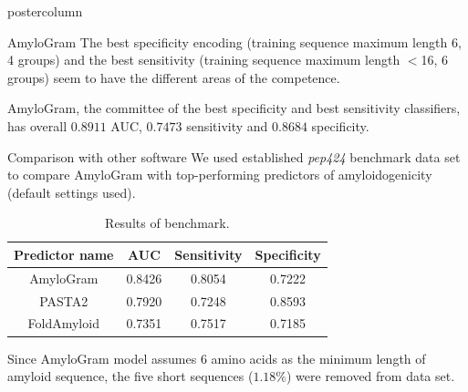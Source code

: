 \documentclass[final]{beamer}\usepackage[]{graphicx}\usepackage[]{color}
\begin{document}
\begin{frame}
\begin{columns}
\begin{column}{.525\textwidth}
\begin{beamercolorbox}[center,wd=\textwidth]{postercolumn}
\begin{minipage}[T]{.95\textwidth}
{%

\begin{block}{AmyloGram}
The best specificity encoding (training sequence maximum length 6, 4 groups) and the best sensitivity (training sequence maximum length $<$16, 6 groups) seem to have the different areas of the competence.

AmyloGram, the committee of the best specificity and best sensitivity classifiers, has overall $0.8911$ AUC, $0.7473$ sensitivity and $0.8684$ specificity.
\end{block}
\vfill

\begin{block}{Comparison with other software}
We used established \textit{pep424} benchmark data set~\citep{walsh_pasta_2014} to compare AmyloGram with top-performing  predictors of amyloidogenicity (default settings used).

\begin{table}[ht]
\centering
\caption{Results of benchmark.} 
\begin{tabular}{c|c|c|c}
  \toprule
Predictor name & AUC & Sensitivity & Specificity \\ 
  \midrule
AmyloGram & 0.8426 & 0.8054 & 0.7222 \\ 
   \rowcolor[gray]{0.75}PASTA2 & 0.7920 & 0.7248 & 0.8593 \\ 
  FoldAmyloid & 0.7351 & 0.7517 & 0.7185 \\ 
   \bottomrule
\end{tabular}
\end{table}


Since AmyloGram model assumes 6 amino acids as the minimum length of amyloid sequence, the five short sequences ($1.18\%$) were removed from data set.
\end{block}
\vfill

}
\end{minipage}
\end{beamercolorbox}
\end{column}
\end{columns}
\end{frame}
\end{document}
